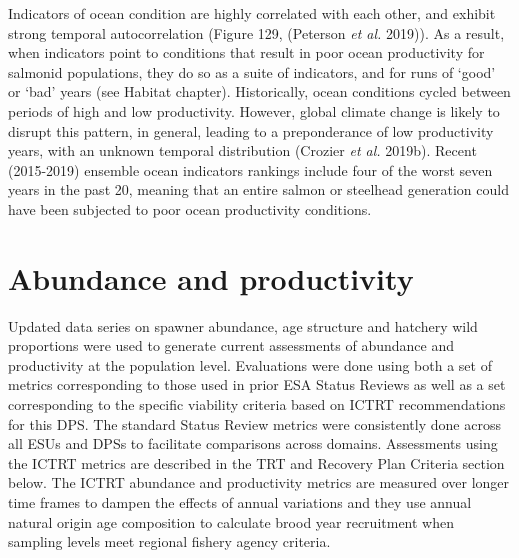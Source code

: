 \documentclass[
  letterpaper,
  oneside,
  open=any]{scrbook}
\begin{document}
Indicators of ocean condition are highly correlated with each other, and
exhibit strong temporal autocorrelation (Figure 129, (Peterson \emph{et
al.} 2019)). As a result, when indicators point to conditions that
result in poor ocean productivity for salmonid populations, they do so
as a suite of indicators, and for runs of `good' or `bad' years (see
Habitat chapter). Historically, ocean conditions cycled between periods
of high and low productivity. However, global climate change is likely
to disrupt this pattern, in general, leading to a preponderance of low
productivity years, with an unknown temporal distribution (Crozier
\emph{et al.} 2019b). Recent (2015-2019) ensemble ocean indicators
rankings include four of the worst seven years in the past 20, meaning
that an entire salmon or steelhead generation could have been subjected
to poor ocean productivity conditions.

\hypertarget{abundance-and-productivity}{%
\section{Abundance and productivity}\label{abundance-and-productivity}}

Updated data series on spawner abundance, age structure and hatchery
wild proportions were used to generate current assessments of abundance
and productivity at the population level. Evaluations were done using
both a set of metrics corresponding to those used in prior ESA Status
Reviews as well as a set corresponding to the specific viability
criteria based on ICTRT recommendations for this DPS. The standard
Status Review metrics were consistently done across all ESUs and DPSs to
facilitate comparisons across domains. Assessments using the ICTRT
metrics are described in the TRT and Recovery Plan Criteria section
below. The ICTRT abundance and productivity metrics are measured over
longer time frames to dampen the effects of annual variations and they
use annual natural origin age composition to calculate brood year
recruitment when sampling levels meet regional fishery agency criteria.
\end{document}
